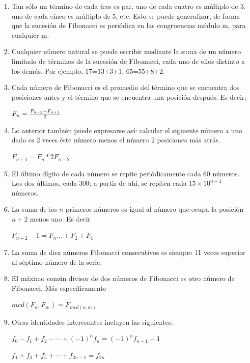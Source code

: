 \begin{enumerate}
	\item Tan sólo un término de cada tres es par, uno de cada cuatro es múltiplo de 3, uno de cada cinco es múltiplo de 5, etc. Esto se puede generalizar, de forma que la sucesión de Fibonacci es periódica en las congruencias módulo m, para cualquier m.
	
	
	\item Cualquier número natural se puede escribir mediante la suma de un número limitado de términos de la sucesión de Fibonacci, cada uno de ellos distinto a los demás. Por ejemplo, 17=13+3+1, 65=55+8+2.
	
	\item Cada número de Fibonacci es el promedio del término que se encuentra dos posiciones antes y el término que se encuentra una posición después. Es decir:
	
	$ F_{n} = { F_{n-2} + F_{n+1}  \over 2}$
	
	\item Lo anterior también puede expresarse así: calcular el siguiente número a uno dado es 2 veces éste número menos el número 2 posiciones más atrás.
	
	$F_{n+1} = F_{n} * 2 F_{n-2}$
	
	\item El último dígito de cada número se repite periódicamente cada 60 números. Los dos últimos, cada 300; a partir de ahí, se repiten cada $15\times10^{n-1}$ números.
	
	\item La suma de los $n$ primeros números es igual al número que ocupa la posición $n+2$ menos uno. Es decir
	
	$F_{n+2}-1 = F_{n} ... +F_{2}+F_{1}$
	
	\item  La suma de diez números Fibonacci consecutivos es siempre 11 veces superior al séptimo número de la serie.
	
	\item  El máximo común divisor de dos números de Fibonacci es otro número de Fibonacci. Más específicamente
	
	$mcd(F_{n},F_{m}) = F_{mcd(n,m)}$
	
	\item Otras identidades interesantes incluyen las siguientes:
	
	$f_0-f_1+f_2-\cdots+(-1)^nf_n=(-1)^nf_{n-1}-1$
	
	$f_1+f_3+f_5+\cdots+f_{2n-1}=f_{2n}$
	

\end{enumerate}
